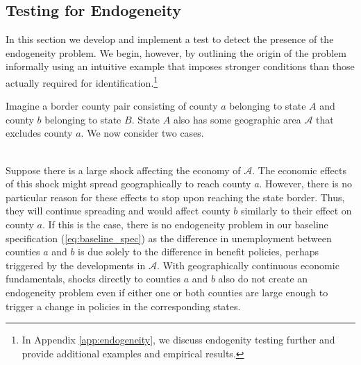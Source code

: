 \documentclass[12pt]{article}
\newcommand{\1}{\mathbf{1}}
\begin{document}
\subsection{Testing for Endogeneity}
\label{sec:endogeneity_test}

In this section we develop and implement a test to detect the presence of the endogeneity problem. We begin, however, by outlining the origin of the problem informally using an intuitive example that imposes stronger conditions than those actually required for identification.\footnote{In Appendix \ref{app:endogeneity}, we discuss endogenity testing further and provide additional examples and empirical results.}

Imagine a border county pair consisting of county $a$ belonging to state $A$ and county $b$ belonging to state $B$. State $A$ also has some geographic area $\mathcal{A}$ that excludes county $a$. We now consider two cases.

\vspace{0.3cm} \\
Suppose there is a large shock affecting the economy of $\mathcal{A}$. The economic effects of this shock might spread geographically to reach county $a$. However, there is no particular reason for these effects to stop upon reaching the state border. Thus, they will continue spreading and would affect county $b$ similarly to their effect on county $a$. If this is the case, there is no endogeneity problem in our baseline specification (\ref{eq:baseline_spec}) as the difference in unemployment between counties $a$ and $b$ is due solely to the difference in benefit policies, perhaps triggered by the developments in $\mathcal{A}$. With geographically continuous economic fundamentals, shocks directly to counties $a$ and $b$ also do not create an endogeneity problem even if either one or both counties are large enough to trigger a change in policies in the corresponding states.
\end{document}
